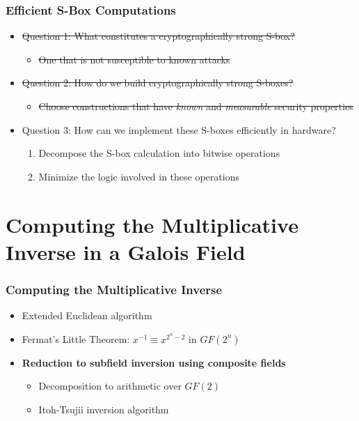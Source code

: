 \documentclass[10pt]{beamer}
\begin{document}
\begin{frame}
\frametitle{Efficient S-Box Computations}
	\begin{itemize}
		\item \sout{Question 1: What constitutes a cryptographically strong S-box?}
		\medskip
		\begin{itemize}
			\item \sout{One that is not susceptible to known attacks}
		\end{itemize}
		\medskip
		\item \sout{Question 2: How do we build cryptographically strong S-boxes?}
		\medskip
		\begin{itemize}
			\item \sout{Choose constructions that have \emph{known} and \emph{measurable} security properties}
		\end{itemize}
		\medskip
		\item Question 3: How can we implement these S-boxes efficiently in hardware?
		\medskip
		\begin{enumerate}
			\item Decompose the S-box calculation into bitwise operations
			\item Minimize the logic involved in these operations
		\end{enumerate}
	\end{itemize}
\end{frame}

\section{Computing the Multiplicative Inverse in a Galois Field}
\begin{frame}
	\frametitle{Computing the Multiplicative Inverse}
	\begin{itemize}
		\item Extended Euclidean algorithm
		\pause
		\item Fermat's Little Theorem: $x^{-1} \equiv x^{2^n - 2}$ in $GF(2^n)$
		\pause
		\item \textbf{Reduction to subfield inversion using composite fields}
		\pause
		\begin{itemize}
			\item Decomposition to arithmetic over $GF(2)$ 
			\pause
			\item Itoh-Tsujii inversion algorithm
		\end{itemize}
	\end{itemize}
\end{frame}
\end{document}
